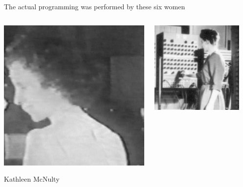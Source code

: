 \documentclass[aspectratio=169]{beamer}
\begin{document}
\begin{frame}{The actual programming was performed by these six women}
\vspace{-0.4 cm}
\begin{columns}[t]
\begin{center}
\includegraphics[width=\linewidth]{Kay-McNulty.jpg}

Kathleen McNulty
\end{center}

\begin{center}
\includegraphics[width=\linewidth]{Fran-Bilas.jpg}


\end{center}
\end{columns}
\end{frame}
\end{document}

